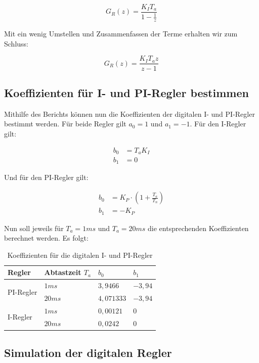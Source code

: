 \documentclass{report}
\begin{document}
$$G_{R}(z) = \frac{K_{I}T_{a}}{1-\frac{1}{z}}$$

Mit ein wenig Umstellen und Zusammenfassen der Terme erhalten wir zum Schluss:

$$G_{R}(z) = \frac{K_{I}T_{a}z}{z-1}$$

\subsection{Koeffizienten für I- und PI-Regler bestimmen}
\label{sec:koeffizienten-fur-i}

Mithilfe des Berichts können nun die Koeffizienten der digitalen I- und PI-Regler bestimmt werden. Für beide Regler gilt $a_{0} = 1$ und $a_{1} = -1$. Für den I-Regler gilt:

\begin{align}
  \label{eq:1}
  b_{0} &= T_{a}K_{I}\\
  b_{1} &= 0
\end{align}

Und für den PI-Regler gilt:

\begin{align}
  \label{eq:2}
  b_{0} &= K_{P} \cdot (1 + \frac{T_{a}}{T_{n}})\\
  b_{1} &= -K_{P}
\end{align}

Nun soll jeweils für $T_{a} = 1ms$ und $T_{a} = 20ms$ die entsprechenden Koeffizienten berechnet werden. Es folgt:

\begin{table}[!ht]
  \centering
  \begin{tabular}{|l|l|l|l|}
	\hline
	Regler & Abtastzeit $T_{a}$ & $b_{0}$ & $b_{1}$ \\
	\hline
	\multirow{2}{*}{PI-Regler} & $1ms$ & $3,9466$ & $-3,94$ \\
	\cline{2-4}
		   & $20ms$ & $4,071333$ & $-3,94$\\
	\hline
	\multirow{2}{*}{I-Regler} & $1ms$ & $0,00121$ & $0$ \\
	\cline{2-4}
	& $20ms$ & $0,0242$ & $0$\\
	\hline
  \end{tabular}
  \caption{Koeffizienten für die digitalen I- und PI-Regler}
  \label{tab:koeIPI}
\end{table}


\subsection{Simulation der digitalen Regler}
\label{sec:simul-der-digit}
\end{document}
